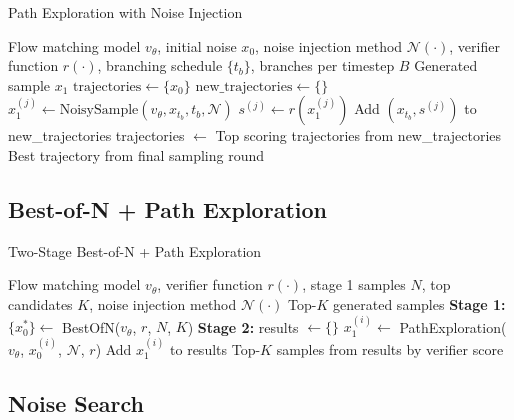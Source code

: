 \documentclass{article}
\begin{document}
\begin{algorithm}[H]
\caption{Path Exploration with Noise Injection}
\label{alg:path-exploration}
\begin{algorithmic}[1]
\Require Flow matching model $v_\theta$, initial noise $x_0$, noise injection method $\mathcal{N}(\cdot)$, verifier function $r(\cdot)$, branching schedule $\{t_b\}$, branches per timestep $B$
\Ensure Generated sample $x_1$
\State $\text{trajectories} \leftarrow \{x_0\}$ 
    \State $\text{new\_trajectories} \leftarrow \{\}$
            \State $x_1^{(j)} \leftarrow \text{NoisySample}(v_\theta, x_{t_b}, t_b, \mathcal{N})$ 
            \State $s^{(j)} \leftarrow r(x_1^{(j)})$ 
            \State Add $(x_{t_b}, s^{(j)})$ to new\_trajectories
        \EndFor
    \EndFor
    \State trajectories $\leftarrow$ Top scoring trajectories from new\_trajectories
\EndFor
\State \Return Best trajectory from final sampling round
\end{algorithmic}
\end{algorithm}

\subsection{Best-of-N + Path Exploration}

\begin{algorithm}[H]
\caption{Two-Stage Best-of-N + Path Exploration}
\label{alg:best-of-n-path-exploration}
\begin{algorithmic}[1]
\Require Flow matching model $v_\theta$, verifier function $r(\cdot)$, stage 1 samples $N$, top candidates $K$, noise injection method $\mathcal{N}(\cdot)$
\Ensure Top-$K$ generated samples
\State \textbf{Stage 1:} $\{x_0^*\} \leftarrow$ BestOfN($v_\theta$, $r$, $N$, $K$) 
\State \textbf{Stage 2:} results $\leftarrow \{\}$
    \State $x_1^{(i)} \leftarrow$ PathExploration($v_\theta$, $x_0^{(i)}$, $\mathcal{N}$, $r$) 
    \State Add $x_1^{(i)}$ to results
\EndFor
\State \Return Top-$K$ samples from results by verifier score
\end{algorithmic}
\end{algorithm}

\subsection{Noise Search}
\end{document}
